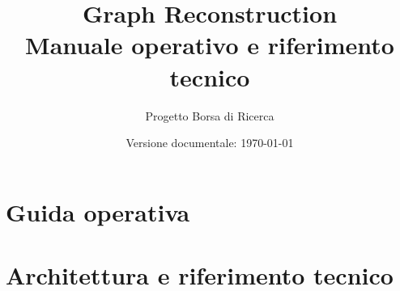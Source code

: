 \documentclass[11pt,a4paper,openany]{report}
\title{\textbf{Graph Reconstruction}\\[0.5em]
       \Large Manuale operativo e riferimento tecnico}
\author{Progetto Borsa di Ricerca}
\date{Versione documentale: \today}
\begin{document}
\hypersetup{pageanchor=false}
\maketitle
\clearpage
\hypersetup{pageanchor=true}

\tableofcontents
\clearpage
{}

\part{Guida operativa}





\part{Architettura e riferimento tecnico}





\appendix

\end{document}
